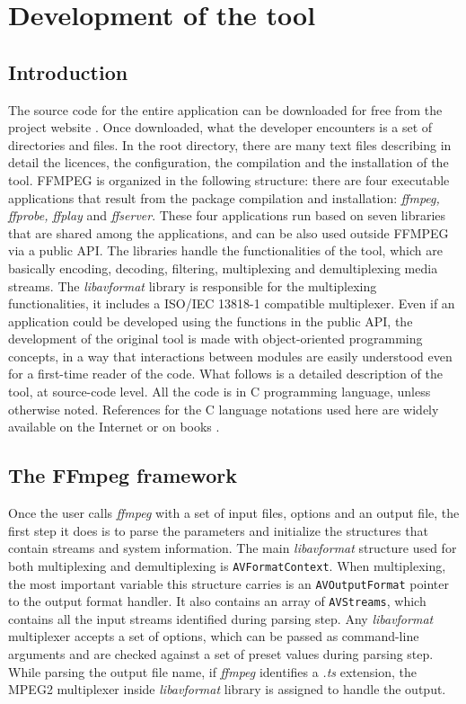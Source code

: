 \documentclass[
	12pt,				%
	openright,			%
	twoside,			%
	a4paper,			%
	brazil,
	french,				%
	english
	]{abntex2}
\begin{document}
\chapter{Development of the tool}

\section{Introduction}

The source code for the entire application can be downloaded for free from the project website \cite{ffmpeg}. Once downloaded, what the developer encounters is a set of directories and files. In the root directory, there are many text files describing in detail the licences, the configuration, the compilation and the installation of the tool. FFMPEG is organized in the following structure: there are four executable applications that result from the package compilation and installation: \textit{ffmpeg, ffprobe, ffplay} and \textit{ffserver}. These four applications run based on seven libraries that are shared among the applications, and can be also used outside FFMPEG via a public API. The libraries handle the functionalities of the tool, which are basically encoding, decoding, filtering, multiplexing and demultiplexing media streams. The \textit{libavformat} library is responsible for the multiplexing functionalities, it includes a ISO/IEC 13818-1 compatible multiplexer. Even if an application could be developed using the functions in the public API, the development of the original tool is made with object-oriented programming concepts, in a way that interactions between modules are easily understood even for a first-time reader of the code. What follows is a detailed description of the tool, at source-code level. All the code is in C programming language, unless otherwise noted. References for the C language notations used here are widely available on the Internet \cite{cpp_reference} or on books \cite{ritchie}.

\section{The FFmpeg framework}

Once the user calls \textit{ffmpeg} with a set of input files, options and an output file, the first step it does is to parse the parameters and initialize the structures that contain streams and system information. The main \textit{libavformat} structure used for both multiplexing and demultiplexing is \texttt{AVFormatContext}. When multiplexing, the most important variable this structure carries is an \texttt{AVOutputFormat} pointer to the output format handler. It also contains an array of \texttt{AVStreams}, which contains all the input streams identified during parsing step. Any \textit{libavformat} multiplexer accepts a set of options, which can be passed as command-line arguments and are checked against a set of preset values during parsing step. While parsing the output file name, if \textit{ffmpeg} identifies a \textit{.ts} extension, the MPEG2 multiplexer inside \textit{libavformat} library is assigned to handle the output.
\end{document}
